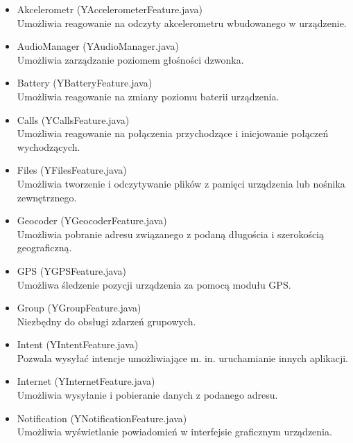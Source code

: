 \documentclass[11pt,a4paper,polish,thesis]{dcsbook}
\begin{document}
\begin{itemize}
\item{Akcelerometr (YAccelerometerFeature.java)} \\
Umożliwia reagowanie na odczyty akcelerometru wbudowanego w urządzenie. 

\item{AudioManager (YAudioManager.java)}\\
Umożliwia zarządzanie poziomem głośności dzwonka.

\item{Battery (YBatteryFeature.java)}\\
Umożliwia reagowanie na zmiany poziomu baterii urządzenia.

\item{Calls (YCallsFeature.java)}\\
Umożliwia reagowanie na połączenia przychodzące i inicjowanie połączeń wychodzących.

\item{Files (YFilesFeature.java)}\\
Umożliwia tworzenie i odczytywanie plików z pamięci urządzenia lub nośnika zewnętrznego.

\item{Geocoder (YGeocoderFeature.java)}\\
Umożliwia pobranie adresu związanego z podaną długościa i szerokością geograficzną.

\item{GPS (YGPSFeature.java)}\\
Umożliwa śledzenie pozycji urządzenia za pomocą modułu GPS.

\item{Group (YGroupFeature.java)}\\
Niezbędny do obsługi zdarzeń grupowych.

\item{Intent (YIntentFeature.java)}\\
Pozwala wysyłać intencje\cite{android.intent} umożliwiające m. in. uruchamianie innych aplikacji.

\item{Internet (YInternetFeature.java)}\\
Umożliwia wysyłanie i pobieranie danych z podanego adresu.

\item{Notification (YNotificationFeature.java)}\\
Umożliwia wyświetlanie powiadomień w interfejsie graficznym urządzenia.


\end{itemize}
\end{document}
